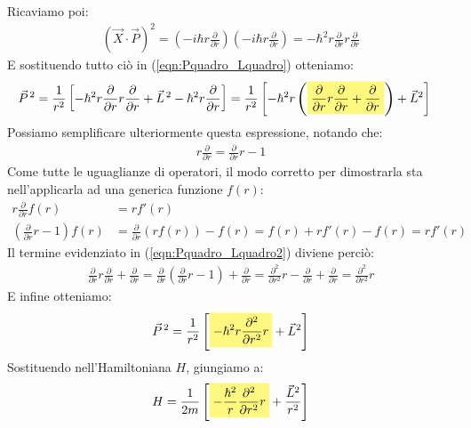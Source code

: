 \documentclass[../../FisicaTeorica.tex]{subfiles}
\begin{document}
Ricaviamo poi:
\begin{align*}
(\vec{X}\cdot \vec{P})^2 = \left(-i\hbar r\frac{\partial}{\partial r}\right)\left(-i\hbar r \frac{\partial}{\partial r}\right) = -\hbar^2 r \frac{\partial}{\partial r} r \frac{\partial}{\partial r}
\end{align*}
E sostituendo tutto ciò in (\ref{eqn:Pquadro_Lquadro}) otteniamo:
\begin{align}
\vec{P}^{\,2} &= \frac{1}{r^2} \left[ -\hbar^2 r \frac{\partial}{\partial r} {r \frac{\partial }{\partial r}} + \vec{L}^{\,2} - \hbar^{2} r \frac{\partial}{\partial r}\right]=\frac{1}{r^2}\left[-\hbar^2 r\left(\hlc{Yellow}{\frac{\partial}{\partial r}r\frac{\partial}{\partial r}+\frac{\partial}{\partial r}}\right) + \vec{L}^2 \right]
\label{eqn:Pquadro_Lquadro2}
\end{align}
Possiamo semplificare ulteriormente questa espressione, notando che:
\begin{align*}
r\frac{\partial}{\partial r} = \frac{\partial}{\partial r}r-1
\end{align*}
Come tutte le uguaglianze di operatori, il modo corretto per dimostrarla sta nell'applicarla ad una generica funzione $f(r)$:
\begin{align*}
r\frac{\partial}{\partial r} f(r)&= r f'(r)\\
\left(\frac{\partial}{\partial r}r-1\right)f(r)&=\frac{\partial}{\partial r}(rf(r))-f(r) = f(r)+rf'(r)-f(r)=rf'(r)
\end{align*}
Il termine evidenziato in (\ref{eqn:Pquadro_Lquadro2}) diviene perciò:
\begin{align*}
\frac{\partial}{\partial r}r\frac{\partial}{\partial r} + \frac{\partial}{\partial r} = \frac{\partial}{\partial r}\left(\frac{\partial}{\partial r}r-1\right)+\frac{\partial}{\partial r}=\frac{\partial^2}{\partial r^2}r-\frac{\partial}{\partial r} + \frac{\partial}{\partial r} =\frac{\partial^2}{\partial r^2}r
\end{align*}
E infine otteniamo:
\begin{align}
\vec{P}^{\,2}=\frac{1}{r^2}\left[\hlc{Yellow}{-\hbar^2r \frac{\partial^2}{\partial r^2}r}+ \vec{L}^2 \right]
\label{eqn:Pquadro_Lquadro3}
\end{align}
Sostituendo nell'Hamiltoniana $H$, giungiamo a:
\begin{align}
H=\frac{1}{2m}\left[\hlc{Yellow}{-\frac{\hbar^2}{r}\frac{\partial^2}{\partial r^2}r} +\frac{\vec{L}^2}{r^2}\right]
\label{eqn:hamiltoniana-centrale}
\end{align}
\end{document}

